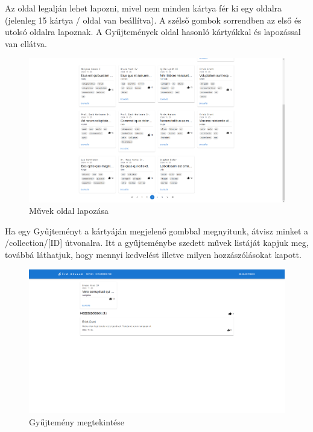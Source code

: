 Az oldal legalján lehet lapozni, mivel nem minden kártya fér ki egy oldalra (jelenleg 15 kártya / oldal van beállítva).
A szélső gombok sorrendben az első és utolsó oldalra lapoznak. A Gyűjtemények oldal hasonló kártyákkal és lapozással van ellátva.

\begin{figure}[H]
    \centering
    \includegraphics[scale=0.3]{./figures/works-pagination.png}
    \caption{Művek oldal lapozása}
    \label{fig:works-pagination}
\end{figure}

Ha egy Gyűjteményt a kártyáján megjelenő gombbal megnyitunk, átvisz minket a /collection/[ID] útvonalra.
Itt a gyűjteménybe szedett művek listáját kapjuk meg, továbbá láthatjuk, hogy mennyi kedvelést illetve milyen hozzászólásokat kapott.

\begin{figure}[H]
    \centering
    \includegraphics[scale=0.3]{./figures/collection-page.png}
    \caption{Gyűjtemény megtekintése}
    \label{fig:collection-page}
\end{figure}


